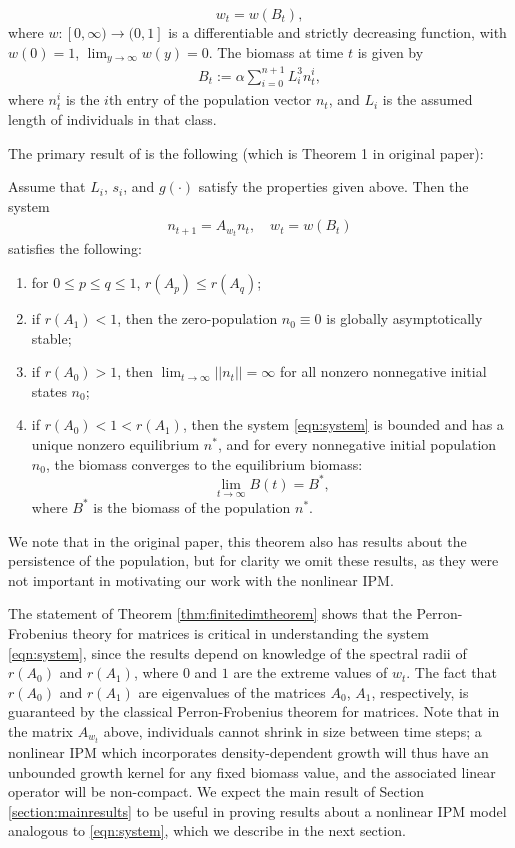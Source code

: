 \[w_t = w(B_t),\]
where $w: [0,\infty) \to (0,1]$ is a differentiable and strictly decreasing function, with $w(0) = 1$, $\lim_{y \to \infty} w(y) = 0$. The biomass at time $t$ is given by
\begin{align}
	B_t := \alpha \sum_{i = 0}^{n+1} L_i^3 n_t^i, \label{eqn:matrixbiomass}
\end{align}
where $n_t^i$ is the $i$th entry of the population vector $n_t$, and $L_i$ is the assumed length of individuals in that class.

The primary result of \cite{Callahan2019} is the following (which is Theorem 1 in original paper):

\begin{theorem} \label{thm:finitedimtheorem}
	Assume that $L_i$, $s_i$, and $g(\cdot)$ satisfy the properties given above. Then the system
	\begin{align}
		n_{t + 1} = A_{w_t} n_t, \quad w_t = w(B_t) \label{eqn:system}
	\end{align}
	satisfies the following:
	\begin{enumerate}
		\item for $0 \leq p \leq q \leq 1$, $r(A_p) \leq r(A_q)$;
		\item if $r(A_1) < 1$, then the zero-population $n_0 \equiv 0$ is globally asymptotically stable;
		\item if $r(A_0) >1$, then $\lim_{t \to \infty} ||n_t|| = \infty$ for all nonzero nonnegative initial states $n_0$;
		\item if $r(A_0) < 1 < r(A_1)$, then the system \eqref{eqn:system} is bounded and has a unique nonzero equilibrium $n^*$, and for every nonnegative initial population $n_0$, the biomass converges to the equilibrium biomass:
		\[\lim_{t \to \infty} B(t) = B^*,\]
		where $B^*$ is the biomass of the population $n^*$.
	\end{enumerate}
\end{theorem}
We note that in the original paper, this theorem also has results about the persistence of the population, but for clarity we omit these results, as they were not important in motivating our work with the nonlinear IPM.

The statement of Theorem \ref{thm:finitedimtheorem} shows that the Perron-Frobenius theory for matrices is critical in understanding the system \eqref{eqn:system}, since the results depend on knowledge of the spectral radii of $r(A_0)$ and $r(A_1)$, where $0$ and $1$ are the extreme values of $w_t$. The fact that $r(A_0)$ and $r(A_1)$ are eigenvalues of the matrices $A_0$, $A_1$, respectively, is guaranteed by the classical Perron-Frobenius theorem for matrices. Note that in the matrix $A_{w_t}$ above, individuals cannot shrink in size between time steps; a nonlinear IPM which incorporates density-dependent growth will thus have an unbounded growth kernel for any fixed biomass value, and the associated linear operator will be non-compact. We expect the main result of Section \ref{section:mainresults} to be useful in proving results about a nonlinear IPM model analogous to \eqref{eqn:system}, which we describe in the next section. 

